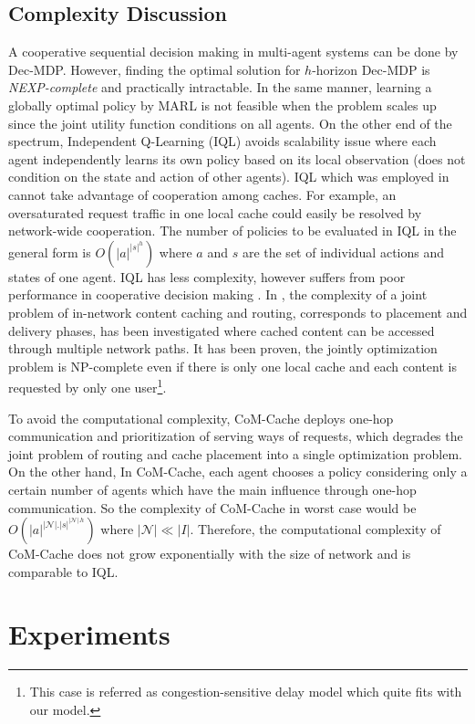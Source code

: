 \documentclass[journal,onecolumn]{IEEEtran}
\begin{document}
\subsection{Complexity Discussion}
A cooperative sequential decision making in multi-agent systems can be done by Dec-MDP. However, finding the optimal solution for $h$-horizon Dec-MDP is \textit{NEXP-complete} \cite{bernstein2002complexity} and practically intractable. In the same manner, learning a globally optimal policy by MARL is not feasible when the problem scales up since the joint utility function conditions on all agents. On the other end of the spectrum, Independent Q-Learning (IQL) avoids scalability issue where each agent independently learns its own policy based on its local observation (does not condition on the state and action of other agents). IQL which was employed in \cite{sung2016efficient} cannot take advantage of cooperation among caches. For example, an oversaturated request traffic in one local cache could easily be resolved by network-wide cooperation. The number of policies to be evaluated in IQL in the general form is $O(|a|^{|s|^{h}})$ where $a$ and $s$ are the set of individual actions and states of one agent. IQL has less complexity, however suffers from poor performance in cooperative decision making \cite{claus1998dynamics}. 
In \cite{dehghan2015complexity}, the complexity of a joint problem of in-network content caching and routing, corresponds to placement and delivery phases, has been investigated where cached content can be accessed through multiple network paths. It has been proven, the jointly optimization problem is NP-complete even if there is only one local cache and each content is requested by only one user\footnote{This case is referred as congestion-sensitive delay model which quite fits with our model.}.

To avoid the computational complexity, CoM-Cache deploys one-hop communication and prioritization of serving ways of requests, which degrades the joint problem of routing and cache placement into a single optimization problem. 
On the other hand, In CoM-Cache, each agent chooses a policy considering only a certain number of agents which have the main influence through one-hop communication. So the complexity of CoM-Cache in worst case would be $O(|a|^{|\mathcal{N}|.|s|^{|\mathcal{N}|.h}})$ where $|\mathcal{N}|\ll  |I|$. 
Therefore, the computational complexity of CoM-Cache does not grow exponentially with the size of network and is comparable to IQL.

\section{Experiments}
\label{result}
\end{document}
